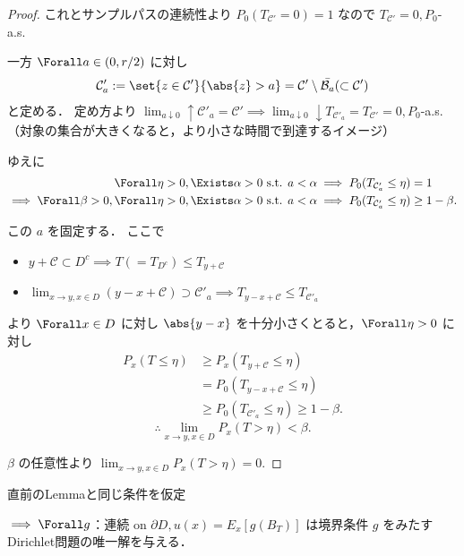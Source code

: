 \documentclass{jsarticle}
\begin{document}
\begin{proof}
    これとサンプルパスの連続性より $P_0(T_{\mathcal{C}'}=0) = 1$ なので $T_{\mathcal{C}'}=0, P_0$-a.s.\nazo

    一方 $\Forall a\in(0, r/2)$ に対し
    \begin{align}
        \mathcal{C}'_a
        := \set{z\in\mathcal{C}'}{\abs{z}>a}
        = \mathcal{C}'\setminus \bar{\mathcal{B}_{a}}
        (\subset \mathcal{C}')
    \end{align}
    と定める．
    定め方より $\lim_{a\downarrow0}\uparrow\mathcal{C}'_a=\mathcal{C}'\implies \lim_{a\downarrow0}\downarrow T_{\mathcal{C}'_a}=T_{\mathcal{C}'}=0, P_0$-a.s.（対象の集合が大きくなると，より小さな時間で到達するイメージ）

    ゆえに 
    \begin{align}
        \Forall \eta>0, \Exists \alpha>0\text{ s.t. }
        & a<\alpha\implies P_0(T_{\mathcal{C}'_a}\le\eta)=1 \\
        \implies 
        \Forall \beta>0, \Forall \eta>0, \Exists \alpha>0\text{ s.t. }
        & a<\alpha\implies P_0(T_{\mathcal{C}'_a}\le\eta)\ge1-\beta.
    \end{align}

    この $a$ を固定する．
    ここで
    \begin{itemize}
        \item 
        $y+\mathcal{C}\subset D^c\implies T(=T_{D^c})\le T_{y+\mathcal{C}}$
        \item
        $\lim_{x\to y, x\in D}(y-x+\mathcal{C})\supset \mathcal{C}'_a\implies T_{y-x+\mathcal{C}}\le T_{\mathcal{C}'_a}$
    \end{itemize}
     より $\Forall x\in D$ に対し $\abs{y-x}$ を十分小さくとると，$\Forall \eta>0$ に対し
     \begin{align}
         P_x(T\le\eta)
         &\ge P_x(T_{y+\mathcal{C}}\le\eta) \\
         &= P_0(T_{y-x+\mathcal{C}}\le\eta) \\
         &\ge P_0(T_{\mathcal{C}'_a}\le\eta)
         \ge 1-\beta.
     \end{align}
     $$
     \therefore 
     \lim_{x\to y, x\in D}P_x(T>\eta)<\beta.
     $$

     $\beta$ の任意性より $\lim_{x\to y, x\in D}P_x(T>\eta)=0.$
\end{proof}


\begin{shadebox}
    \setcounter{thm}{7}
    \begin{thm}[Dirichlet問題の解]
        直前のLemmaと同じ条件を仮定
        
        $\implies \Forall g$：連続 on $\partial D, u(x) = E_x[g(B_T)]$ は境界条件 $g$ をみたすDirichlet問題の唯一解を与える．
    \end{thm}
\end{shadebox}
\end{document}

